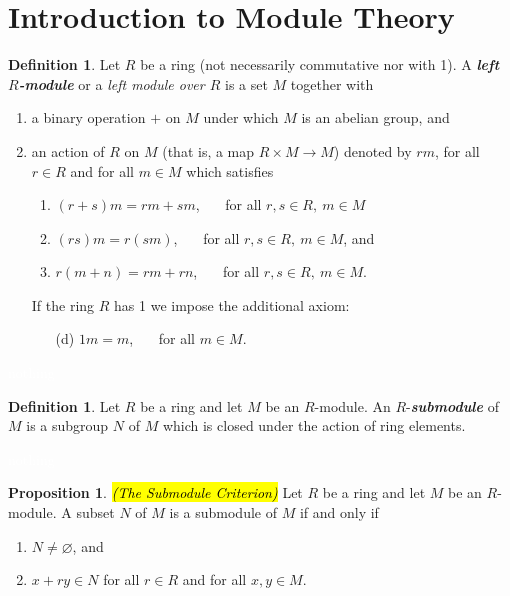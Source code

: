 \documentclass{article}
\theoremstyle{definition}
\newtheorem{prop}[thm]{Proposition}
\newtheorem{defn}[thm]{Definition}
\newcommand{\nl}{\textcolor{white}{nothing}}
\newcommand{\ra}{\rightarrow}
\newcommand{\es}{\varnothing}
\begin{document}
\section{Introduction to Module Theory}
\setcounter{thm}{0}

\begin{defn}
Let $R$ be a ring (not necessarily commutative nor with 1). A \textit{\textbf{left $R$-module}} or a \textit{left module over $R$} is a set $M$ together with
\begin{enumerate}
\item a binary operation $+$ on $M$ under which $M$ is an abelian group, and
\item an action of $R$ on $M$ (that is, a map $R\times M\ra M$) denoted by $rm$, for all $r\in R$ and for all $m\in M$ which satisfies
\begin{enumerate}
\item $(r + s)m = rm + sm$, \ \ \ for all $r,s\in R,\ m\in M$
\item $(rs)m = r(sm)$, \ \ \ for all $r,s\in R,\ m\in M$, and 
\item $r(m + n) = rm + rn$, \ \ \ for all $r,s\in R,\ m\in M$.
\end{enumerate}
If the ring $R$ has 1 we impose the additional axiom:
\begin{enumerate}
\item[(d)]  $1m = m$, \ \ \ for all $m\in M$.
\end{enumerate}
\end{enumerate}
\end{defn}

\nl

\begin{defn}
Let $R$ be a ring and let $M$ be an $R$-module. An $R$-\textit{\textbf{submodule}} of $M$ is a subgroup $N$ of $M$ which is closed under the action of ring elements. 
\end{defn}

\nl

\begin{prop}
\hl{\textit{(The Submodule Criterion)}} Let $R$ be a ring and let $M$ be an $R$-module. A subset $N$ of $M$ is a submodule of $M$ if and only if
\begin{enumerate}
\item $N\neq \es$, and
\item $x + ry\in N$ for all $r\in R$ and for all $x,y\in M$.
\end{enumerate}
\end{prop}
\end{document}
